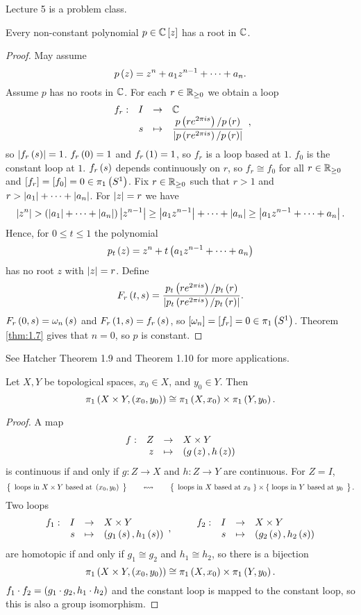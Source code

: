 
Lecture 5 is a problem class.

\pagebreak


\begin{theorem}
Every non-constant polynomial $ p \in \mathbb{C}\left[ z \right] $ has a root in $ \mathbb{C} $.
\end{theorem}

\begin{proof}
May assume
$$ p\left( z \right) = z^n + a_1z^{n - 1} + \dots + a_n. $$
Assume $ p $ has no roots in $ \mathbb{C} $. For each $ r \in \mathbb{R}_{\ge 0} $ we obtain a loop
$$ \function[f_r]{I}{\C}{s}{\dfrac{p\rb{re^{2\pi is}} / p\rb{r}}{\abs{p\rb{re^{2\pi is}} / p\rb{r}}}}, $$
so $ \left\lvert f_r\left( s \right) \right\rvert = 1 $. $ f_r\left( 0 \right) = 1 $ and $ f_r\left( 1 \right) = 1 $, so $ f_r $ is a loop based at $ 1 $. $ f_0 $ is the constant loop at $ 1 $. $ f_r\left( s \right) $ depends continuously on $ r $, so $ f_r \cong f_0 $ for all $ r \in \mathbb{R}_{\ge 0} $ and $ \left[ f_r \right] = \left[ f_0 \right] = 0 \in \pi_1\left( S^1 \right) $. Fix $ r \in \mathbb{R}_{\ge 0} $ such that $ r > 1 $ and $ r > \left\lvert a_1 \right\rvert + \dots + \left\lvert a_n \right\rvert $. For $ \left\lvert z \right\rvert = r $ we have
$$ \left\lvert z^n \right\rvert > \left( \left\lvert a_1 \right\rvert + \dots + \left\lvert a_n \right\rvert \right)\left\lvert z^{n - 1} \right\rvert \ge \left\lvert a_1z^{n - 1} \right\rvert + \dots + \left\lvert a_n \right\rvert \ge \left\lvert a_1z^{n - 1} + \dots + a_n \right\rvert. $$
Hence, for $ 0 \le t \le 1 $ the polynomial
$$ p_t\left( z \right) = z^n + t\left( a_1z^{n - 1} + \dots + a_n \right) $$
has no root $ z $ with $ \left\lvert z \right\rvert = r $. Define
$$ F_r\left( t, s \right) = \dfrac{p_t\left( re^{2\pi is} \right) / p_t\left( r \right)}{\left\lvert p_t\left( re^{2\pi is} \right) / p_t\left( r \right) \right\rvert}. $$
$ F_r\left( 0, s \right) = \omega_n\left( s \right) $ and $ F_r\left( 1, s \right) = f_r\left( s \right) $, so $ \left[ \omega_n \right] = \left[ f_r \right] = 0 \in \pi_1\left( S^1 \right) $. Theorem \ref{thm:1.7} gives that $ n = 0 $, so $ p $ is constant.
\end{proof}

See Hatcher Theorem 1.9 and Theorem 1.10 for more applications.

\begin{proposition}
Let $ X, Y $ be topological spaces, $ x_0 \in X $, and $ y_0 \in Y $. Then
$$ \pi_1\left( X \times Y, \left( x_0, y_0 \right) \right) \cong \pi_1\left( X, x_0 \right) \times \pi_1\left( Y, y_0 \right). $$
\end{proposition}

\begin{proof}
A map
$$ \function[f]{Z}{X \times Y}{z}{\rb{g\rb{z}, h\rb{z}}} $$
is continuous if and only if $ g : Z \to X $ and $ h : Z \to Y $ are continuous. For $ Z = I $,
$$ \correspondence{\text{loops in} \ X \times Y \ \text{based at} \ \rb{x_0, y_0}}{\text{loops in} \ X \ \text{based at} \ x_0 \ \} \times \{ \ \text{loops in} \ Y \ \text{based at} \ y_0}. $$
Two loops
$$ \function[f_1]{I}{X \times Y}{s}{\rb{g_1\rb{s}, h_1\rb{s}}}, \qquad \function[f_2]{I}{X \times Y}{s}{\rb{g_2\rb{s}, h_2\rb{s}}} $$
are homotopic if and only if $ g_1 \cong g_2 $ and $ h_1 \cong h_2 $, so there is a bijection
$$ \pi_1\left( X \times Y, \left( x_0, y_0 \right) \right) \cong \pi_1\left( X, x_0 \right) \times \pi_1\left( Y, y_0 \right). $$
$ f_1 \cdot f_2 = \left( g_1 \cdot g_2, h_1 \cdot h_2 \right) $ and the constant loop is mapped to the constant loop, so this is also a group isomorphism.
\end{proof}

